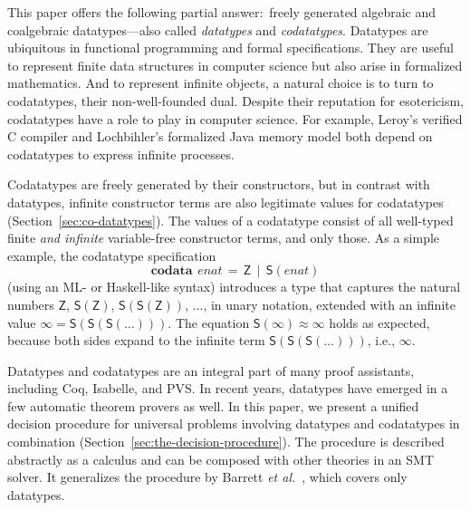\documentclass[letter]{article}
\theoremstyle{plain}
\theoremstyle{definition}
\newcommand\keyw[1]{\textbf{#1}}
\newcommand\const[1]{\textsf{#1}}
\newcommand\ty[1]{\textit{#1}}
\newcommand{\teq}{\approx}
\begin{document}
This paper offers the following partial answer:\ 
freely generated algebraic
and coalgebraic datatypes---also called \emph{datatypes} and
\emph{codatatypes}.
Datatypes are ubiquitous in functional programming and formal specifications.
They are useful to represent finite data structures in computer
science but also arise in formalized mathematics.
And to represent infinite objects,
a natural choice is to turn to codatatypes,
their non-well-founded dual.
%
Despite their reputation for esotericism, codatatypes have a
role to play in computer science. For example,
Leroy's verified C compiler %
and Lochbihler's formalized Java memory model
 both depend on codatatypes to express infinite
processes.

Codatatypes are freely generated by their constructors, but in contrast with datatypes,
infinit\-e constructor terms are also legitimate values for codatatypes
(Section~\ref{sec:co-datatypes}). The
values of a codatatype consist of all well-typed finite \emph{and infinite} variable-free
constructor
terms, and only those. As a simple example, the codatatype specification
%
\[\keyw{codata}~\,\ty{enat} \,=\, \const{Z} \,\mid\, \const{S}(\ty{enat})\]
%
(using an ML- or Haskell-like syntax)
introduces a type that
captures the natural numbers $\const{Z}$, $\const{S}(\const{Z})$, $\const{S}(\const{S}(\const{Z}))$, $\dotsc$,
in unary notation, extended with an
infinite value $\infty = \const{S}(\const{S}(\const{S}(\ldots)))$.
The equation $\const{S}(\infty) \teq \infty$ holds as expected,
because both sides expand to the infinite term
$\const{S}(\const{S}(\const{S}(\ldots)))$, i.e., $\infty$.

Datatypes and codatatypes are an integral part of many proof assistants,
including Coq, Isabelle, and PVS. In recent years, datatypes
have emerged in a few automatic theorem provers as well.
In this paper, we present a
unified decision procedure for universal problems involving datatypes and codatatypes
in combination (Section~\ref{sec:the-decision-procedure}).
The procedure is described abstractly as a %
calculus and can be composed with other theories in an SMT solver.
It generalizes the procedure by Barrett {\em et al.}\
,
which covers only datatypes.
\end{document}
